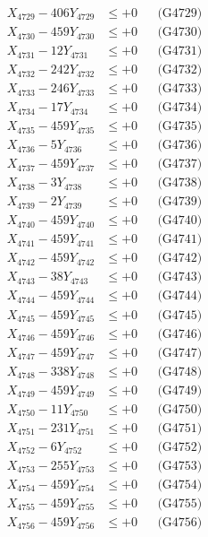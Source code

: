 \documentclass[a4paper,10pt]{article}
\begin{document}
{\begin{align}
X_{4729} - 406Y_{4729} &\leq +0 && \text{(G4729)} \\
X_{4730} - 459Y_{4730} &\leq +0 && \text{(G4730)} \\
\allowbreak
X_{4731} - 12Y_{4731} &\leq +0 && \text{(G4731)} \\
X_{4732} - 242Y_{4732} &\leq +0 && \text{(G4732)} \\
X_{4733} - 246Y_{4733} &\leq +0 && \text{(G4733)} \\
X_{4734} - 17Y_{4734} &\leq +0 && \text{(G4734)} \\
X_{4735} - 459Y_{4735} &\leq +0 && \text{(G4735)} \\
X_{4736} - 5Y_{4736} &\leq +0 && \text{(G4736)} \\
X_{4737} - 459Y_{4737} &\leq +0 && \text{(G4737)} \\
X_{4738} - 3Y_{4738} &\leq +0 && \text{(G4738)} \\
X_{4739} - 2Y_{4739} &\leq +0 && \text{(G4739)} \\
X_{4740} - 459Y_{4740} &\leq +0 && \text{(G4740)} \\
\allowbreak
X_{4741} - 459Y_{4741} &\leq +0 && \text{(G4741)} \\
X_{4742} - 459Y_{4742} &\leq +0 && \text{(G4742)} \\
X_{4743} - 38Y_{4743} &\leq +0 && \text{(G4743)} \\
X_{4744} - 459Y_{4744} &\leq +0 && \text{(G4744)} \\
X_{4745} - 459Y_{4745} &\leq +0 && \text{(G4745)} \\
X_{4746} - 459Y_{4746} &\leq +0 && \text{(G4746)} \\
X_{4747} - 459Y_{4747} &\leq +0 && \text{(G4747)} \\
X_{4748} - 338Y_{4748} &\leq +0 && \text{(G4748)} \\
X_{4749} - 459Y_{4749} &\leq +0 && \text{(G4749)} \\
X_{4750} - 11Y_{4750} &\leq +0 && \text{(G4750)} \\
\allowbreak
X_{4751} - 231Y_{4751} &\leq +0 && \text{(G4751)} \\
X_{4752} - 6Y_{4752} &\leq +0 && \text{(G4752)} \\
X_{4753} - 255Y_{4753} &\leq +0 && \text{(G4753)} \\
X_{4754} - 459Y_{4754} &\leq +0 && \text{(G4754)} \\
X_{4755} - 459Y_{4755} &\leq +0 && \text{(G4755)} \\
X_{4756} - 459Y_{4756} &\leq +0 && \text{(G4756)} \\

\end{align}}
\end{document}
